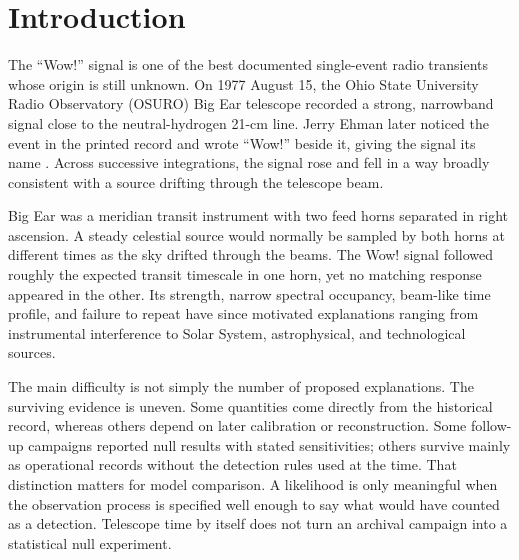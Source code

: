 \documentclass[crop]{CSL}
\begin{document}
\keywords{}

\maketitle


\section{Introduction}
\label{sec:intro}

The ``Wow!'' signal is one of the best documented single-event radio transients whose origin is still unknown. On 1977 August 15, the Ohio State University Radio Observatory (OSURO) Big Ear telescope recorded a strong, narrowband signal close to the neutral-hydrogen 21-cm line. Jerry Ehman later noticed the event in the printed record and wrote ``Wow!'' beside it, giving the signal its name \citep{ehman1997}. Across successive integrations, the signal rose and fell in a way broadly consistent with a source drifting through the telescope beam.

\Fpagebreak

Big Ear was a meridian transit instrument with two feed horns separated in right ascension. A steady celestial source would normally be sampled by both horns at different times as the sky drifted through the beams. The Wow! signal followed roughly the expected transit timescale in one horn, yet no matching response appeared in the other. Its strength, narrow spectral occupancy, beam-like time profile, and failure to repeat have since motivated explanations ranging from instrumental interference to Solar System, astrophysical, and technological sources.

The main difficulty is not simply the number of proposed explanations. The surviving evidence is uneven. Some quantities come directly from the historical record, whereas others depend on later calibration or reconstruction. Some follow-up campaigns reported null results with stated sensitivities; others survive mainly as operational records without the detection rules used at the time. That distinction matters for model comparison. A likelihood is only meaningful when the observation process is specified well enough to say what would have counted as a detection. Telescope time by itself does not turn an archival campaign into a statistical null experiment.
\end{document}
